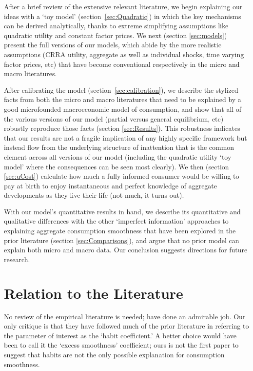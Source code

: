 \documentclass[titlepage]{\econtex}\newcommand{\texname}{cAndCwithStickyE}
\begin{document}
After a brief review of the extensive relevant literature, we begin explaining our ideas with a `toy model' (section~\ref{sec:Quadratic}) in which the key mechanisms can be derived analytically, thanks to extreme simplifying assumptions like quadratic utility and constant factor prices.  We next (section \ref{sec:models}) present the full versions of our models, which abide by the more realistic assumptions (CRRA utility, aggregate as well as individual shocks, time varying factor prices, etc) that have become conventional respectively in the micro and macro literatures.

After calibrating the model (section~\ref{sec:calibration}), we describe the stylized facts from both the micro and macro literatures that need to be explained by a good microfounded macroeconomic model of consumption, and show that all of the various versions of our model (partial versus general equilibrium, etc) robustly reproduce those facts (section \ref{sec:Results}).  This robustness indicates that our results are not a fragile implication of any highly specific framework but instead flow from the underlying structure of inattention that is the common element across all versions of our model (including the quadratic utility `toy model' where the consequences can be seen most clearly).  We then (section \ref{sec:uCost}) calculate how much a fully informed consumer would be willing to pay at birth to enjoy instantaneous and perfect knowledge of aggregate developments as they live their life (not much, it turns out).

With our model's quantitative results in hand, we describe its quantitative and qualitative differences with the other `imperfect information' approaches to explaining aggregate consumption smoothness that have been explored in the prior literature (section \ref{sec:Comparisons}), and argue that no prior model can explain both micro and macro data.  Our conclusion suggests directions for future research.

\section{Relation to the Literature}\label{sec:relation}

No review of the empirical literature is needed; \cite{hrsHabit} have done an admirable job.  Our only critique is that they have followed much of the prior literature in referring to the parameter of interest as the `habit coefficient.'  A better choice would have been to call it the `excess smoothness' coefficient; ours is not the first paper to suggest that habits are not the only possible explanation for consumption smoothness.
\end{document}
